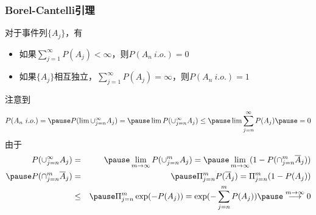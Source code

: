 \begin{frame}
  \frametitle{Borel-Cantelli引理}
  \begin{thm}
    对于事件列$\{A_j\}$，有
    \begin{itemize}[<+-|alert@+>]
    \item 如果$\sum_{j=1}^\infty P(A_j)<\infty$，则$P(A_n\ i.o.)=0$
    \item 如果$\{A_j\}$相互独立，$\sum_{j=1}^\infty P(A_j)=\infty$，则$P(A_n\ i.o.)=1$
    \end{itemize}
  \end{thm}\pause
  \zheng 注意到
  \begin{eqnarray*}
    P(A_n\ i.o.)=\pause P(\lim \cup_{j=n}^\infty A_j)=\pause \lim P(\cup_{j=n}^\infty A_j)\le \pause \lim\sum_{j=n}^\infty P(A_j)\pause =0
  \end{eqnarray*}
  \pause
  由于\pause
  \begin{eqnarray*}
    P(\cup_{j=n}^\infty A_j)&=&\pause \lim_{m\rightarrow\infty}P(\cup_{j=n}^m A_j)=\pause \lim_{m\rightarrow\infty}(1-P(\cap_{j=n}^m\overline{A}_j))\\\pause
    P(\cap_{j=n}^m\overline{A}_j)&=&\pause \Pi_{j=n}^m P(\overline{A}_j)=\Pi_{j=n}^m(1-P(A_j))\\
                            &\le&\pause \Pi_{j=n}^m \exp(-P(A_j))=\exp(-\sum_{j=n}^m P(A_j))\pause \stackrel{m\rightarrow\infty}{\longrightarrow} 0
  \end{eqnarray*}

\end{frame}







